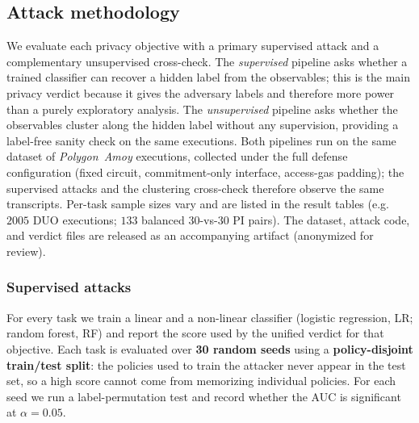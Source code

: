 \subsection{Attack methodology}
\label{sec:eval-method}

We evaluate each privacy objective with a primary supervised attack and a complementary unsupervised cross-check.
The \emph{supervised} pipeline asks whether a trained classifier can recover a hidden label from the observables; this is the main privacy verdict because it gives the adversary labels and therefore more power than a purely exploratory analysis. 
The \emph{unsupervised} pipeline asks whether the observables cluster along the hidden label without any supervision, providing a label-free sanity check on the same executions.
Both pipelines run on the same dataset of \emph{Polygon~Amoy} executions, collected under the full defense configuration (fixed circuit, commitment-only interface, access-gas padding); the supervised attacks and the clustering cross-check therefore observe the same transcripts. Per-task sample sizes vary and are listed in the result tables (e.g.\ $2005$ DUO executions; $133$ balanced $30$-vs-$30$ PI pairs).
The dataset, attack code, and verdict files are released as an accompanying artifact (anonymized for review).

\subsubsection{Supervised attacks}
For every task we train a linear and a non-linear classifier (logistic regression, LR; random forest, RF) and report the score used by the unified verdict for that objective.
Each task is evaluated over \textbf{30 random seeds} using a \textbf{policy-disjoint train/test split}: the policies used to train the attacker never appear in the test set, so a high score cannot come from memorizing
individual policies. 
For each seed we run a label-permutation test and record whether the AUC is significant at $\alpha{=}0.05$.

